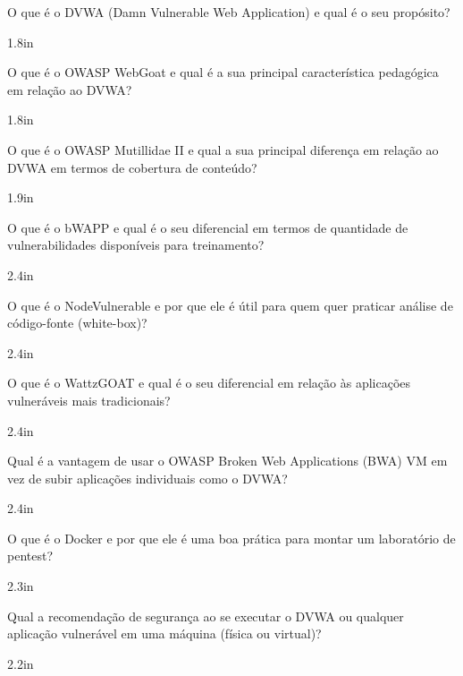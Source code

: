 \documentclass[12pt]{exam}
\begin{document}
	\noindent
\begin{questions}
	\question O que é o DVWA (Damn Vulnerable Web Application) e qual é o seu propósito?
		\begin{solutionbox}{1.8in} \end{solutionbox}

	\question O que é o OWASP WebGoat e qual é a sua principal característica pedagógica em relação ao DVWA?
		\begin{solutionbox}{1.8in} \end{solutionbox}

	\question O que é o OWASP Mutillidae II e qual a sua principal diferença em relação ao DVWA em termos de cobertura de conteúdo?
		\begin{solutionbox}{1.9in} \end{solutionbox}

	\question O que é o bWAPP e qual é o seu diferencial em termos de quantidade de vulnerabilidades disponíveis para treinamento?
		\begin{solutionbox}{2.4in} \end{solutionbox}

	\question O que é o NodeVulnerable e por que ele é útil para quem quer praticar análise de código-fonte (white-box)?
		\begin{solutionbox}{2.4in} \end{solutionbox}

	\question O que é o WattzGOAT e qual é o seu diferencial em relação às aplicações vulneráveis mais tradicionais?
		\begin{solutionbox}{2.4in} \end{solutionbox}

	\question Qual é a vantagem de usar o OWASP Broken Web Applications (BWA) VM em vez de subir aplicações individuais como o DVWA?
		\begin{solutionbox}{2.4in} \end{solutionbox}

	\question O que é o Docker e por que ele é uma boa prática para montar um laboratório de pentest?
		\begin{solutionbox}{2.3in} \end{solutionbox}

	\question Qual a recomendação de segurança ao se executar o DVWA ou qualquer aplicação vulnerável em uma máquina (física ou virtual)?
		\begin{solutionbox}{2.2in} \end{solutionbox}


\end{questions}
\end{document}
